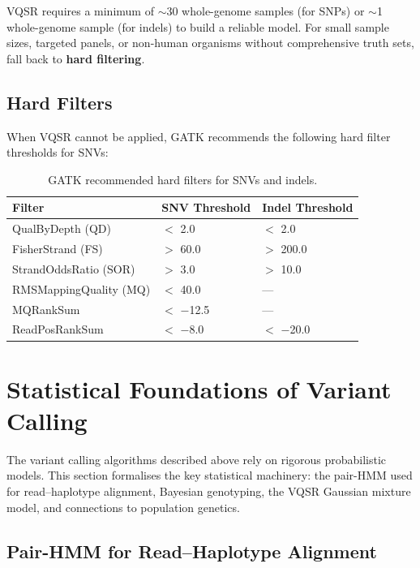 \begin{warningbox}[title={When VQSR Fails}]
VQSR requires a minimum of $\sim$30 whole-genome samples (for SNPs) or $\sim$1 whole-genome sample (for indels) to build a reliable model. For small sample sizes, targeted panels, or non-human organisms without comprehensive truth sets, fall back to \textbf{hard filtering}.
\end{warningbox}

\subsection{Hard Filters}

When VQSR cannot be applied, GATK recommends the following hard filter thresholds for SNVs:

\begin{table}[htbp]
\centering
\caption{GATK recommended hard filters for SNVs and indels.}
\label{tab:hard_filters}
\begin{tabular}{@{}lll@{}}
\toprule
\textbf{Filter} & \textbf{SNV Threshold} & \textbf{Indel Threshold} \\
\midrule
QualByDepth (QD) & $<$ 2.0 & $<$ 2.0 \\
FisherStrand (FS) & $>$ 60.0 & $>$ 200.0 \\
StrandOddsRatio (SOR) & $>$ 3.0 & $>$ 10.0 \\
RMSMappingQuality (MQ) & $<$ 40.0 & --- \\
MQRankSum & $<$ $-$12.5 & --- \\
ReadPosRankSum & $<$ $-$8.0 & $<$ $-$20.0 \\
\bottomrule
\end{tabular}
\end{table}

\section{Statistical Foundations of Variant Calling}
\label{sec:variant_stats}

The variant calling algorithms described above rely on rigorous probabilistic models. This section formalises the key statistical machinery: the pair-HMM used for read--haplotype alignment, Bayesian genotyping, the VQSR Gaussian mixture model, and connections to population genetics.

\subsection{Pair-HMM for Read--Haplotype Alignment}
\label{subsec:variants:pairhmm}

